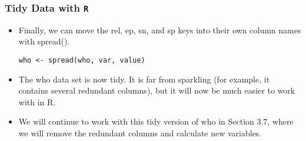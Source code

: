 \documentclass[TIDYMASTER.tex]{subfiles}
\begin{document}
\begin{frame}[fragile]
\frametitle{Tidy Data with \texttt{R}}
\Large
\begin{itemize}
\item Finally, we can move the rel, ep, sn, and sp keys into their own column names with spread().

\begin{verbatim}
who <- spread(who, var, value)
\end{verbatim}
\item The who data set is now tidy. It is far from sparkling (for example, it contains several redundant columns), but it will now be much easier to work with in R. 
\item We will continue to work with this tidy version of who in Section 3.7, where we will remove the redundant columns and calculate new variables.

\end{itemize}

\end{frame}
\end{document}
